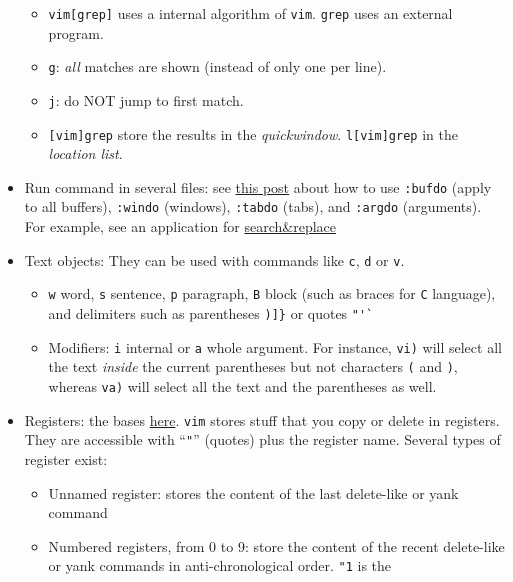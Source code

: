 \documentclass[a4paper,12pt,%
              final%
              ]{article}
\newcommand{\vim}{\texttt{vim}}
\begin{document}
\begin{itemize}
\begin{itemize}
      \item \texttt{vim[grep]} uses a internal algorithm of \texttt{vim}.
        \texttt{grep} uses an external program.
      \item \texttt{g}: \emph{all} matches are shown (instead of only one per line).
      \item \texttt{j}: do NOT jump to first match.
      \item \texttt{[vim]grep} store the results in the \emph{quickwindow}.
        \texttt{l[vim]grep} in the \emph{location list}.
    \end{itemize}
  \item Run command in several files: see
    \href{https://vim.fandom.com/wiki/Run_a_command_in_multiple_buffers}{this post}
    about how to use \verb|:bufdo| (apply to all buffers), \verb|:windo| (windows),
    \verb|:tabdo| (tabs), and \verb|:argdo| (arguments). For example, see an
    application for
    \href{https://vim.fandom.com/wiki/Search_and_replace_in_multiple_buffers}{search\&replace}
  \item Text objects: They can be used with commands like \texttt{c}, \texttt{d} or
    \texttt{v}.
    \begin{itemize}
      \item \texttt{w} word, \texttt{s} sentence, \texttt{p} paragraph, \texttt{B}
        block (such as braces for \texttt{C} language), and delimiters such as
        parentheses \verb|)]}| or quotes \verb|"'`|
      \item Modifiers: \texttt{i} internal or \texttt{a} whole argument. For
        instance, \texttt{vi)} will select all the text \emph{inside} the current
        parentheses but not characters \texttt{(} and \texttt{)}, whereas
        \texttt{va)} will select all the text and the parentheses as well.
    \end{itemize}
  \item Registers: the bases \href{https://www.brianstorti.com/vim-registers/}{here}.
    \vim{} stores stuff that you copy or delete in registers. They are accessible
    with ``\texttt{"}'' (quotes) plus the register name. Several types of register
    exist:
    \begin{itemize}
      \item Unnamed register: stores the content of the last delete-like or yank
        command
      \item Numbered registers, from 0 to 9: store the content of the recent
        delete-like or yank commands in anti-chronological order. \texttt{"1} is the

\end{itemize}
\end{itemize}
\end{document}
